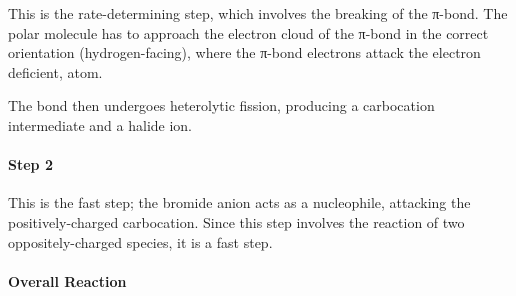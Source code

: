 			This is the rate-determining step, which involves the breaking of the π-bond. The polar  molecule has to
			approach the electron cloud of the π-bond in the correct orientation (hydrogen-facing), where the π-bond electrons
			attack the electron deficient,  atom.

			The  bond then undergoes heterolytic fission, producing a carbocation intermediate and a halide ion.


			\pagebreak
			\paragraph{Step 2}


			This is the fast step; the bromide anion acts as a nucleophile, attacking the positively-charged carbocation.
			Since this step involves the reaction of two oppositely-charged species, it is a fast step.


			\paragraph{Overall Reaction}











